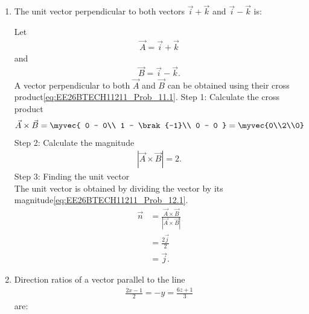 \begin{enumerate}[label=\thesubsection.\arabic*, ref=\thesubsection.\theenumi]
\item
The unit vector perpendicular to both vectors
$\vec{i}+\vec{k}$ and $\vec{i}-\vec{k}$ is:

\begin{enumerate}
\end{enumerate}
\solution
Let
\begin{align}
\vec{A}=\vec{i}+\vec{k}
\end{align}
and
\begin{align}
\vec{B}=\vec{i}-\vec{k}.
\end{align}
A vector perpendicular to both $\vec{A}$ and $\vec{B}$
can be obtained using their cross product\eqref{eq:EE26BTECH11211_Prob_11.1}.
{Step 1: Calculate the cross product}
\begin{align}
\vec{A}\times\vec{B}
=
\myvec{
0 - 0\\
1 - \brak{-1}\\
0 - 0
}&=\myvec{0\\2\\0}
\end{align}
{Step 2: Calculate the magnitude}
\begin{align}
|\vec{A}\times\vec{B}|=2.
\end{align}
{Step 3: Finding the unit vector}
\\The unit vector is obtained by dividing the vector
by its magnitude\eqref{eq:EE26BTECH11211_Prob_12.1}.
\begin{align}
\vec{n}
&=\frac{\vec{A}\times\vec{B}}
{|\vec{A}\times\vec{B}|}\\[6pt]
&=\frac{2\vec{j}}{2}\\[6pt]
&=\vec{j}.
\end{align}

\item
Direction ratios of a vector parallel to the line
\begin{align}
\frac{2x-1}{2}=-y=\frac{6z+1}{3}
\end{align}
are:

\begin{enumerate}
\end{enumerate}


\end{enumerate}
